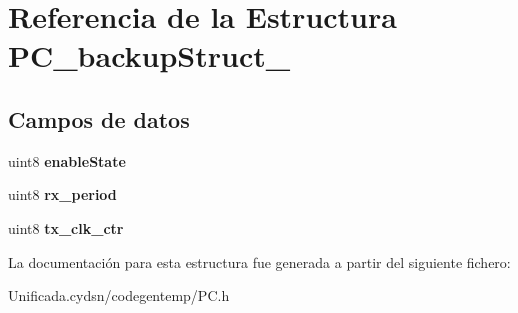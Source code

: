 \hypertarget{struct_p_c__backup_struct__}{}\section{Referencia de la Estructura P\+C\+\_\+backup\+Struct\+\_\+}
\label{struct_p_c__backup_struct__}
\subsection*{Campos de datos}
\begin{DoxyCompactItemize}
\item 
\mbox{\label{struct_p_c__backup_struct___a0d9eac82e0d9647810c46a0da6e36302}} 
uint8 {\bfseries enable\+State}
\item 
\mbox{\label{struct_p_c__backup_struct___ae3d4a93a1533c2c9d210fe52c0d0d387}} 
uint8 {\bfseries rx\+\_\+period}
\item 
\mbox{\label{struct_p_c__backup_struct___a122d7b41973eb1a1e80482af3f40a9fe}} 
uint8 {\bfseries tx\+\_\+clk\+\_\+ctr}
\end{DoxyCompactItemize}


La documentación para esta estructura fue generada a partir del siguiente fichero\+:\begin{DoxyCompactItemize}
\item 
Unificada.\+cydsn/codegentemp/P\+C.\+h\end{DoxyCompactItemize}
